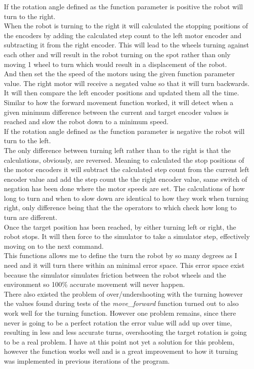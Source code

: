 If the rotation angle defined as the function parameter is positive the robot will turn to the right.\\
When the robot is turning to the right it will calculated the stopping positions of the encoders by adding the calculated step count to the left motor encoder and subtracting it from the right encoder. This will lead to the wheels turning against each other and will result in the robot turning on the spot rather than only moving 1 wheel to turn which would result in a displacement of the robot. \\
And then set the the speed of the motors using the given function parameter value. The right motor will receive a negated value so that it will turn backwards.
It will then compare the left encoder positions and updated them all the time. Similar to how the forward movement function worked, it will detect when a given minimum difference between the current and target encoder values is reached and slow the robot down to a minimum speed. \\[3ex]

If the rotation angle defined as the function parameter is negative the robot will turn to the left.\\
The only difference between turning left rather than to the right is that the calculations, obviously, are reversed. Meaning to calculated the stop positions of the motor encoders it will subtract the calculated step count from the current left encoder value and add the step count the the right
encoder value, same switch of negation has been done where the motor speeds are set.
The calculations of how long to turn and when to slow down are identical to how they work when turning right, only difference being that the the operators to which check how long to turn are different.\\
Once the target position has been reached, by either turning left or right, the robot stops.
It will then force to the simulator to take a simulator step, effectively moving on to the next command.\\[3ex]

This functions allows me to define the turn the robot by so many degrees as I need and it will turn there within an minimal error space. This error space exist because the simulator simulates friction between the robot wheels and the environment so 100\% accurate movement will never happen.\\
There also existed the problem of over/undershooting with the turning however the values found during tests of the \textit{move\_forward} function turned out to also work well for the turning function. However one problem remains, since there never is going to be a perfect rotation the error value will add up over time, resulting in less and less accurate turns, overshooting the target rotation is going to be a real problem. I have at this point not yet a solution for this problem, however the function works well and is a great improvement to how it turning was implemented in previous iterations of the program.

